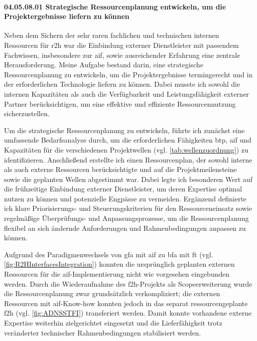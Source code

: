  \paragraph*{04.05.08.01 Strategische Ressourcenplanung entwickeln, um die Projektergebnisse liefern zu
können}
\label{para:04.05.08.01_StrategischeRessourcenplanung}

\par Neben dem Sichern der sehr raren fachlichen und technischen internen Ressourcen für \gls{r2h} war die Einbindung externer Dienstleister mit passendem Fachwissen, insbesondere zur \gls{aif}, sowie ausreichender Erfahrung eine zentrale Herausforderung. Meine Aufgabe bestand darin, eine strategische Ressourcenplanung zu entwickeln, um die Projektergebnisse termingerecht und in der erforderlichen Technologie liefern zu können. Dabei musste ich sowohl die internen Kapazitäten als auch die Verfügbarkeit und Leistungsfähigkeit externer Partner berücksichtigen, um eine effektive und effiziente Ressourcennutzung sicherzustellen.

\par Um die strategische Ressourcenplanung zu entwickeln, führte ich zunächst eine umfassende Bedarfsanalyse durch, um die erforderlichen Fähigkeiten \gls{btp}, \gls{aif} und Kapazitäten für die verschiedenen Projektwellen (vgl. \autoref{tab:wellenzuordnung}) zu identifizieren. Anschließend erstellte ich einen Ressourcenplan, der sowohl interne als auch externe Ressourcen berücksichtigte und auf die Projektmeilensteine sowie die geplanten Wellen abgestimmt war. Dabei legte ich besonderen Wert auf die frühzeitige Einbindung externer Dienstleister, um deren Expertise optimal nutzen zu können und potenzielle Engpässe zu vermeiden. Ergänzend definierte ich klare Priorisierungs- und Steuerungskriterien für den Ressourceneinsatz sowie regelmäßige Überprüfungs- und Anpassungsprozesse, um die Ressourcenplanung flexibel an sich ändernde Anforderungen und Rahmenbedingungen anpassen zu können.

\par Aufgrund des Paradigmenwechsels von \gls{gfa} mit \gls{aif} zu \gls{bfa} mit \gls{ft} (vgl. \autoref{fig:R2HInterfacesIntegration}) konnten die ursprünglich geplanten externen Ressourcen für die \gls{aif}-Implementierung nicht wie vorgesehen eingebunden werden. Durch die Wiederaufnahme des \gls{f2h}-Projekts als Scopeerweiterung wurde die Ressourcenplanung zwar grundsätzlich verkompliziert; die externen Ressourcen mit \gls{aif}-Know-how konnten jedoch in das separat ressourcengeplante \gls{f2h} (vgl. \autoref{fig:ADNSSTFI}) transferiert werden. Damit konnte vorhandene externe Expertise weiterhin zielgerichtet eingesetzt und die Lieferfähigkeit trotz veränderter technischer Rahmenbedingungen stabilisiert werden.

